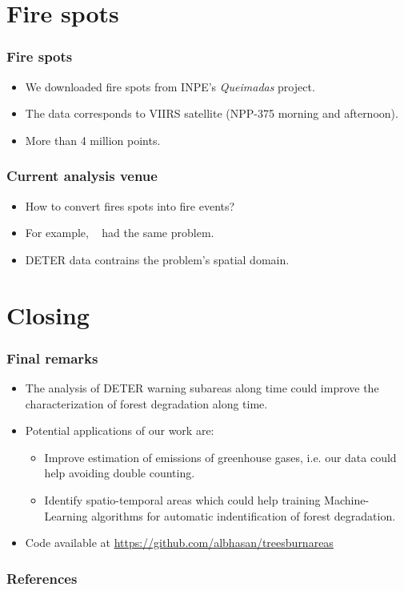 \documentclass[aspectratio=169]{beamer}
\begin{document}
\section{Fire spots}

\begin{frame}
    \frametitle{Fire spots}
    \begin{itemize}
        \item We downloaded fire spots from INPE's \emph{Queimadas} project.
        \item The data corresponds to VIIRS satellite (NPP-375 morning and 
            afternoon).
        \item More than 4 million points.
    \end{itemize}
\end{frame}

\begin{frame}
    \frametitle{Current analysis venue}
    \begin{itemize}
        \item How to convert fires spots into fire events?
        \item For example, ~\cite{andela2022} had the same problem.
        \item DETER data contrains the problem's spatial domain.
    \end{itemize}
\end{frame}


\section{Closing}

\begin{frame}
    \frametitle{Final remarks}
    \begin{itemize}
        \item The analysis of DETER warning subareas along time could improve 
            the characterization of forest degradation along time.
        \item Potential applications of our work are:
            \begin{itemize}
                \item Improve estimation of emissions of greenhouse gases, i.e.
                    our data could help avoiding double counting.
                \item Identify spatio-temporal areas which could help training 
                    Machine-Learning algorithms for automatic indentification 
                    of forest degradation.
            \end{itemize}
        \item Code available at 
            \url{https://github.com/albhasan/treesburnareas}
    \end{itemize}
\end{frame}

\begin{frame}[allowframebreaks]
    \frametitle{References}
    
    
\end{frame}
\end{document}
